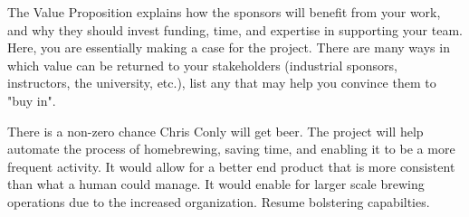 The Value Proposition explains how the sponsors will benefit from your work, and why they should invest funding, time, and expertise in supporting your team. Here, you are essentially making a case for the project. There are many ways in which value can be returned to your stakeholders (industrial sponsors, instructors, the university, etc.), list any that may help you convince them to "buy in".

\vspace{5mm}

There is a non-zero chance Chris Conly will get beer. The project will help automate the process of homebrewing, saving time, and enabling it to be a more frequent activity. It would allow for a better end product that is more consistent than what a human could manage. It would enable for larger scale brewing operations due to the increased organization. Resume bolstering capabilties.